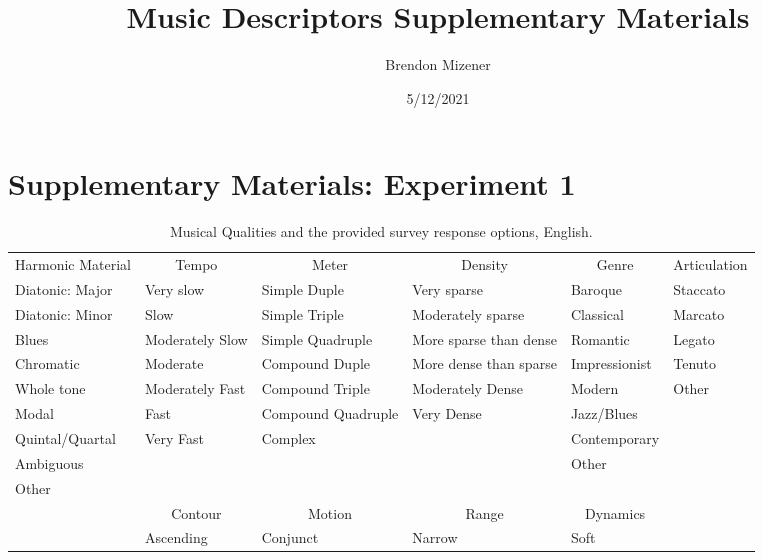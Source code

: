 \documentclass[
]{article}
\title{Music Descriptors Supplementary Materials}
\author{Brendon Mizener}
\date{5/12/2021}
\makeatletter
\newenvironment{lltable}{\begin{landscape}\begin{center}\begin{ThreePartTable}}{\end{ThreePartTable}\end{center}\end{landscape}}
\newcommand\LastLTentrywidth{1em}
\newlength\longtablewidth
\newcommand{\getlongtablewidth}{\begingroup \ifcsname LT@\roman{LT@tables}\endcsname \global\longtablewidth=0pt \renewcommand{\LT@entry}[2]{\global\advance\longtablewidth by ##2\relax\gdef\LastLTentrywidth{##2}}\@nameuse{LT@\roman{LT@tables}} \fi \endgroup}
\makeatother
\begin{document}
\maketitle

\hypertarget{supplementary-materials-experiment-1}{%
\section{Supplementary Materials: Experiment
1}\label{supplementary-materials-experiment-1}}

\begin{lltable}
\begin{footnotesize}
\begin{longtable}{p{}p{}p{}p{}p{}p{}}\noalign{\getlongtablewidth\global\LTcapwidth=\longtablewidth}
\caption{\label{tab:qualitiestable}Musical Qualities and the provided survey response options, English.}\\
\toprule[.8pt]
 \multicolumn{1}{c}{Harmonic Material} & \multicolumn{1}{c}{Tempo} & \multicolumn{1}{c}{Meter} & \multicolumn{1}{c}{Density} & \multicolumn{1}{c}{Genre} & \multicolumn{1}{c}{Articulation}\\
 \midrule
      Diatonic: Major & Very slow & Simple Duple & Very sparse & Baroque & Staccato \\
      Diatonic: Minor & Slow & Simple Triple & Moderately sparse & Classical & Marcato \\
      Blues & Moderately Slow & Simple Quadruple  & More sparse than dense & Romantic & Legato\\
      Chromatic & Moderate & Compound Duple & More dense than sparse & Impressionist & Tenuto\\
      Whole tone & Moderately Fast & Compound Triple & Moderately Dense & Modern & Other \\       
      Modal  & Fast & Compound Quadruple & Very Dense & Jazz/Blues & \\
      Quintal/Quartal  & Very Fast & Complex & & Contemporary & \\
      Ambiguous  & & & & Other & \\
      Other  & & & & & \\
\bottomrule\addlinespace[.5em]
 & \multicolumn{1}{c}{Contour} & \multicolumn{1}{c}{Motion} & \multicolumn{1}{c}{Range} & \multicolumn{1}{c}{Dynamics} & \\
 \cmidrule[.5pt]{2-5}
  & Ascending & Conjunct & Narrow & Soft & \\

\end{longtable}
\end{footnotesize}
\end{lltable}
\end{document}

